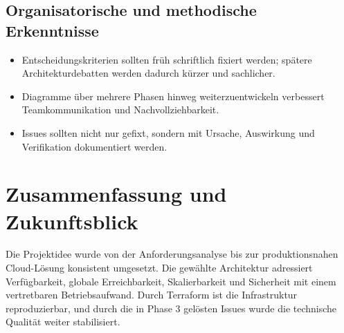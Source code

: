 \documentclass[a4paper,11pt]{article}
\begin{document}
\subsection{Organisatorische und methodische Erkenntnisse}
\begin{itemize}
  \item Entscheidungskriterien sollten früh schriftlich fixiert werden; spätere Architekturdebatten werden dadurch kürzer und sachlicher.
  \item Diagramme über mehrere Phasen hinweg weiterzuentwickeln verbessert Teamkommunikation und Nachvollziehbarkeit.
  \item Issues sollten nicht nur gefixt, sondern mit Ursache, Auswirkung und Verifikation dokumentiert werden.
\end{itemize}

\section{Zusammenfassung und Zukunftsblick}
Die Projektidee wurde von der Anforderungsanalyse bis zur produktionsnahen Cloud-Lösung konsistent umgesetzt. Die gewählte Architektur adressiert Verfügbarkeit, globale Erreichbarkeit, Skalierbarkeit und Sicherheit mit einem vertretbaren Betriebsaufwand. Durch Terraform ist die Infrastruktur reproduzierbar, und durch die in Phase 3 gelösten Issues wurde die technische Qualität weiter stabilisiert.
\end{document}
